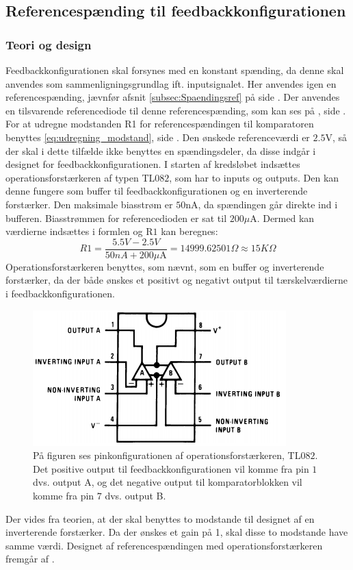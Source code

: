\subsection{Referencespænding til feedbackkonfigurationen}\label{subsec:Spaendingsref_Komparator}
\subsubsection{Teori og design}
Feedbackkonfigurationen skal forsynes med en konstant spænding, da denne skal anvendes som sammenligningsgrundlag ift. inputsignalet. Her anvendes igen en referencespænding, jævnfør afsnit \ref{subsec:Spaendingsref} på side \pageref{subsec:Spaendingsref}. Der anvendes en tilsvarende referencediode til denne referencespænding, som kan ses på , side \pageref{subsec:Spaendingsref}. \\
For at udregne modstanden R1 for referencespændingen til komparatoren benyttes \eqref{eq:udregning_modstand}, side \pageref{eq:udregning_modstand}. Den ønskede referenceværdi er $2.5$V, så der skal i dette tilfælde ikke benyttes en spændingsdeler, da disse indgår i designet for feedbackkonfigurationen. I starten af kredsløbet indsættes operationsforstærkeren af typen TL$082$, som har to inputs og outputs. \cite{Corporation2013} Den kan denne fungere som buffer til feedbackkonfigurationen og en inverterende forstærker. \cite{Schaumann2014} Den maksimale biasstrøm er $50$nA, da spændingen går direkte ind i bufferen. Biasstrømmen for referencedioden er sat til $200\mu$A. Dermed kan værdierne indsættes i formlen og R$1$ kan beregnes:
\begin{equation}
R1 = \frac{5.5V-2.5V}{50nA + 200\mu\text{A}} = 14999.62501\Omega \approx 15K\Omega 
\end{equation} 
Operationsforstærkeren benyttes, som nævnt, som en buffer og inverterende forstærker, da der både ønskes et positivt og negativt output til tærskelværdierne i feedbackkonfigurationen.
\begin{figure}[H]
	\centering
	\includegraphics[scale=0.8]{figures/cProblemloesning/TL082.PNG}
	\caption{På figuren ses pinkonfigurationen af operationsforstærkeren, TL$082$. Det positive output til feedbackkonfigurationen vil komme fra pin $1$ dvs. output A, og det negative output til komparatorblokken vil komme fra pin $7$ dvs. output B. \cite{Corporation2013}}
	\label{fig:TL082}
\end{figure}
\noindent Der vides fra teorien, at der skal benyttes to modstande til designet af en inverterende forstærker. Da der ønskes et gain på 1, skal disse to modstande have samme værdi. \cite{Nilsson2011} Designet af referencespændingen med operationsforstærkeren fremgår af .

